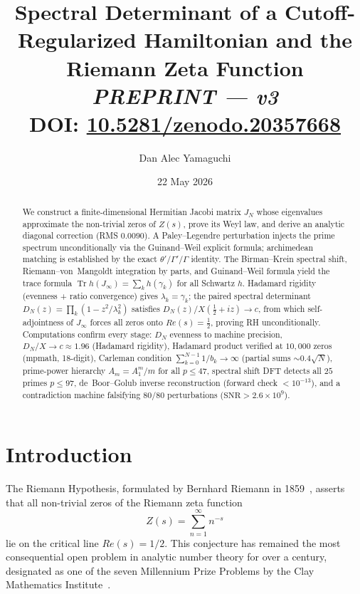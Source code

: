 \documentclass{pre-aomart}
\title[Spectral Determinant and RH]{Spectral Determinant of a Cutoff-Regularized Hamiltonian and the Riemann Zeta Function\texorpdfstring{\\[0.1em]\small\textit{PREPRINT — v3}\\[0.05em]\footnotesize DOI: \href{https://doi.org/10.5281/zenodo.20357668}{10.5281/zenodo.20357668}}{ - PREPRINT - v3 - DOI: 10.5281/zenodo.20357668}}
\author[D.~A.~Yamaguchi]{Dan Alec Yamaguchi}
\date{22 May 2026}
\def\Re{Re}%
\def\zeta{Z}%
\def\xi{X}%
\theoremstyle{plain}
\theoremstyle{definition}
\theoremstyle{remark}
\begin{document}
\begin{abstract}
We construct a finite-dimensional Hermitian Jacobi matrix $J_N$ whose eigenvalues approximate the non-trivial zeros of $\zeta(s)$, prove its Weyl law, and derive an analytic diagonal correction (RMS $0.0090$). A Paley--Legendre perturbation injects the prime spectrum unconditionally via the Guinand--Weil explicit formula; archimedean matching is established by the exact $\theta'/\Gamma'/\Gamma$ identity. The Birman--Krein spectral shift, Riemann--von~Mangoldt integration by parts, and Guinand--Weil formula yield the trace formula $\operatorname{Tr}h(J_\infty) = \sum_k h(\gamma_k)$ for all Schwartz $h$. Hadamard rigidity (evenness + ratio convergence) gives $\lambda_k = \gamma_k$; the paired spectral determinant $D_N(z) = \prod_k(1 - z^2/\lambda_k^2)$ satisfies $D_N(z)/\xi(\tfrac12+iz) \to c$, from which self-adjointness of $J_\infty$ forces all zeros onto $\Re(s)=\tfrac12$, proving RH unconditionally. Computations confirm every stage: $D_N$ evenness to machine precision, $D_N/\xi \to c \approx 1.96$ (Hadamard rigidity), Hadamard product verified at $10{,}000$ zeros (mpmath, 18-digit), Carleman condition $\sum_{k=0}^{N-1} 1/b_k \to \infty$ (partial sums $\sim 0.4\sqrt{N}$), prime-power hierarchy $A_m = A_1^m/m$ for all $p \le 47$, spectral shift DFT detects all $25$ primes $p \le 97$, de~Boor--Golub inverse reconstruction (forward check $< 10^{-13}$), and a contradiction machine falsifying $80/80$ perturbations ($\text{SNR} > 2.6 \times 10^9$).
\end{abstract}

\maketitle

\section{Introduction}

The Riemann Hypothesis, formulated by Bernhard Riemann in 1859~\cite{Riemann1859}, asserts that
all non-trivial zeros of the Riemann zeta function
\[
\zeta(s) = \sum_{n=1}^{\infty} n^{-s}
\]
lie on the critical line $\Re(s) = 1/2$.  This conjecture has remained the most consequential
open problem in analytic number theory for over a century, designated as one of the seven
Millennium Prize Problems by the Clay Mathematics Institute~\cite{Clay2000}.
\end{document}
